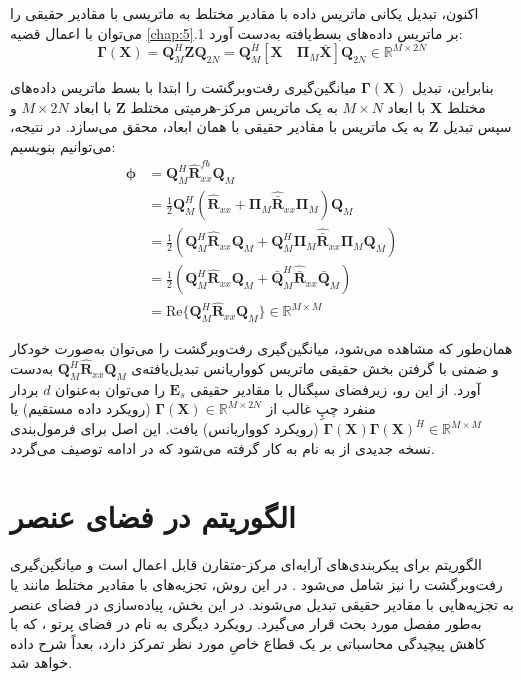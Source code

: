 اکنون، تبدیل یکانی ماتریس داده با مقادیر مختلط به ماتریسی با مقادیر حقیقی را می‌توان با اعمال قضیه \ref{chap:5}.1 بر ماتریس داده‌های بسط‌یافته به‌دست آورد:
\begin{equation}
	\bm{\Gamma}(\bm{X}) = \bm{Q}_M^H \bm{Z} \bm{Q}_{2N} = \bm{Q}_M^H [\bm{X} \quad \bm{\Pi}_M \bar{\bm{X}}] \bm{Q}_{2N} \in \mathbb{R}^{M \times 2N}
	\label{eq:5-27}
\end{equation}

بنابراین، تبدیل $\bm{\Gamma}(\bm{X})$ میانگین‌گیری رفت‌وبرگشت را ابتدا با بسط ماتریس داده‌های مختلط $\bm{X}$ با ابعاد $M \times N$ به یک ماتریس مرکز-هرمیتی مختلط $\bm{Z}$ با ابعاد $M \times 2N$ و سپس تبدیل $\bm{Z}$ به یک ماتریس با مقادیر حقیقی با همان ابعاد، محقق می‌سازد. در نتیجه، می‌توانیم بنویسیم:
\begin{align}
	\bm{\phi} &= \bm{Q}_M^H \hat{\bm{R}}_{xx}^{fb} \bm{Q}_M \nonumber \\
	&= \frac{1}{2} \bm{Q}_M^H (\hat{\bm{R}}_{xx} + \bm{\Pi}_M \hat{\bar{\bm{R}}}_{xx} \bm{\Pi}_M) \bm{Q}_M \nonumber \\
	&= \frac{1}{2} (\bm{Q}_M^H \hat{\bm{R}}_{xx} \bm{Q}_M + \bm{Q}_M^H \bm{\Pi}_M \hat{\bar{\bm{R}}}_{xx} \bm{\Pi}_M \bm{Q}_M) \nonumber \\
	&= \frac{1}{2} (\bm{Q}_M^H \hat{\bm{R}}_{xx} \bm{Q}_M + \bar{\bm{Q}}_M^H \hat{\bar{\bm{R}}}_{xx} \bar{\bm{Q}}_M) \nonumber \\
	&= \text{Re}\{\bm{Q}_M^H \hat{\bm{R}}_{xx} \bm{Q}_M\} \in \mathbb{R}^{M \times M}
	\label{eq:5-28}
\end{align}

همان‌طور که مشاهده می‌شود، میانگین‌گیری رفت‌وبرگشت را می‌توان به‌صورت خودکار و ضمنی با گرفتن بخش حقیقی ماتریس کوواریانس تبدیل‌یافته‌ی $\bm{Q}_M^H \hat{\bm{R}}_{xx} \bm{Q}_M$ به‌دست آورد. از این رو، زیرفضای سیگنال با مقادیر حقیقی $\bm{E}_s$ را می‌توان به‌عنوان $d$ بردار منفرد چپِ غالب از $\bm{\Gamma}(\bm{X}) \in \mathbb{R}^{M \times 2N}$ (رویکرد داده مستقیم) یا $\bm{\Gamma}(\bm{X})\bm{\Gamma}(\bm{X})^H \in \mathbb{R}^{M \times M}$ (رویکرد کوواریانس) یافت. این اصل برای فرمول‌بندی نسخه جدیدی از  به نام  به کار گرفته می‌شود که در ادامه توصیف می‌گردد.

\section{الگوریتم  در فضای عنصر}
\label{sec:5-5}
الگوریتم  برای پیکربندی‌های آرایه‌ای مرکز-متقارن قابل اعمال است و میانگین‌گیری رفت‌وبرگشت را نیز شامل می‌شود \cite{5-3}. در این روش، تجزیه‌های با مقادیر مختلط مانند  یا  به تجزیه‌هایی با مقادیر حقیقی تبدیل می‌شوند. در این بخش، پیاده‌سازی  در فضای عنصر به‌طور مفصل مورد بحث قرار می‌گیرد. رویکرد دیگری به نام  در فضای پرتو ، که با کاهش پیچیدگی محاسباتی بر یک قطاع  خاصِ مورد نظر تمرکز دارد، بعداً شرح داده خواهد شد.

